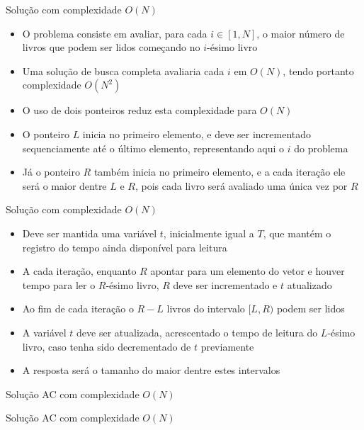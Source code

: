 \begin{frame}[fragile]{Solução com complexidade $O(N)$}

    \begin{itemize}
        \item O problema consiste em avaliar, para cada $i\in [1, N]$, o maior número de
            livros que podem ser lidos começando no $i$-ésimo livro

        \item Uma solução de busca completa avaliaria cada $i$ em $O(N)$, tendo portanto
            complexidade $O(N^2)$

        \item O uso de dois ponteiros reduz esta complexidade para $O(N)$

        \item O ponteiro $L$ inicia no primeiro elemento, e deve ser incrementado sequenciamente
            até o último elemento, representando aqui o $i$ do problema

        \item Já o ponteiro $R$ também inicia no primeiro elemento, e a cada iteração ele será
            o maior dentre $L$ e $R$, pois cada livro será avaliado uma única vez por $R$

   \end{itemize}

\end{frame}

\begin{frame}[fragile]{Solução com complexidade $O(N)$}

    \begin{itemize}
        \item Deve ser mantida uma variável $t$, inicialmente igual a $T$, que mantém o registro
            do tempo ainda disponível para leitura

        \item A cada iteração, enquanto $R$ apontar para um elemento do vetor e houver tempo para
            ler o $R$-ésimo livro, $R$ deve ser incrementado e $t$ atualizado

        \item Ao fim de cada iteração o $R - L$ livros do intervalo $[L, R)$ podem ser lidos

        \item A variável $t$ deve ser atualizada, acrescentado o tempo de leitura do $L$-ésimo
            livro, caso tenha sido decrementado de $t$ previamente

        \item A resposta será o tamanho do maior dentre estes intervalos
   \end{itemize}

\end{frame}

\begin{frame}[fragile]{Solução AC com complexidade $O(N)$}
\end{frame}

\begin{frame}[fragile]{Solução AC com complexidade $O(N)$}
\end{frame}




